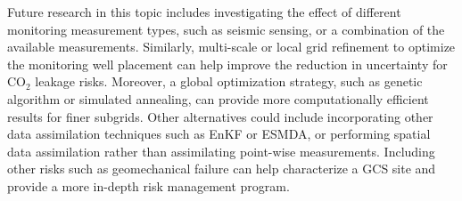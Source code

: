 \documentclass[a4paper,fleqn]{cas-sc}
\begin{document}
Future research in this topic includes investigating the effect of different monitoring measurement types, such as seismic sensing, or a combination of the available measurements. Similarly, multi-scale or local grid refinement to optimize the monitoring well placement can help improve the reduction in uncertainty for CO$_2$ leakage risks. Moreover, a global optimization strategy, such as genetic algorithm or simulated annealing, can provide more computationally efficient results for finer subgrids. Other alternatives could include incorporating other data assimilation techniques such as EnKF or ESMDA, or performing spatial data assimilation rather than assimilating point-wise measurements. Including other risks such as geomechanical failure can help characterize a GCS site and provide a more in-depth risk management program. 


\printcredits

%

\end{document}
